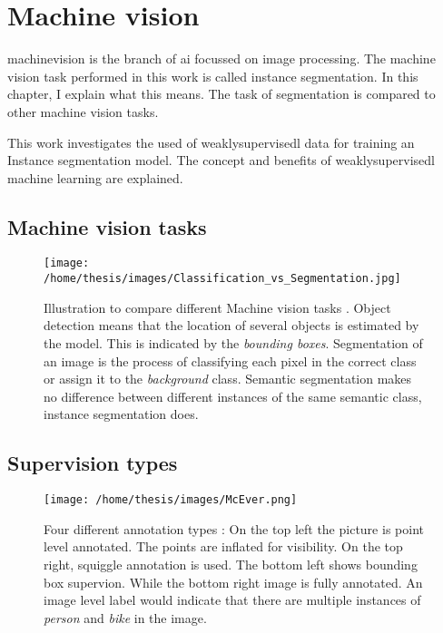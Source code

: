 \chapter{Machine vision}

\Gls{machinevision} is the branch of \Gls{ai} focussed on image processing.
The machine vision task performed in this work is called instance \Gls{segmentation}.
In this chapter, I explain what this means. 
The task of segmentation is compared to other machine vision tasks.

This work investigates the used of \Gls{weaklysupervisedl} data for training an Instance segmentation model. 
The concept and benefits of \Gls{weaklysupervisedl} machine learning are explained.

\section{Machine vision tasks}



\begin{SCfigure}[][htb]
    \centering
    \texttt{[image: /home/thesis/images/Classification\_vs\_Segmentation.jpg]}
    \caption{Illustration to compare different Machine vision tasks \cite{SemTorch76:online}. 
    Object detection means that the location of several objects is estimated by the model. This is indicated by the \textit{bounding boxes}.
    Segmentation of an image is the process of classifying each pixel in the correct class or assign it to the \textit{background} class.
    Semantic segmentation makes no difference between different instances of the same semantic class, instance segmentation does.
    }
\end{SCfigure}

\section{Supervision types}

\begin{SCfigure}[][htb]
    \centering
    \texttt{[image: /home/thesis/images/McEver.png]}
    \caption{Four different annotation types \cite{McEver2020}: 
    On the top left the picture is point level annotated. The points are inflated for visibility.
    On the top right, squiggle annotation is used.
    The bottom left shows bounding box supervion.
    While the bottom right image is fully annotated.
    An image level label would indicate that there are multiple instances of \textit{person} and \textit{bike} in the image.
    }
\end{SCfigure}

